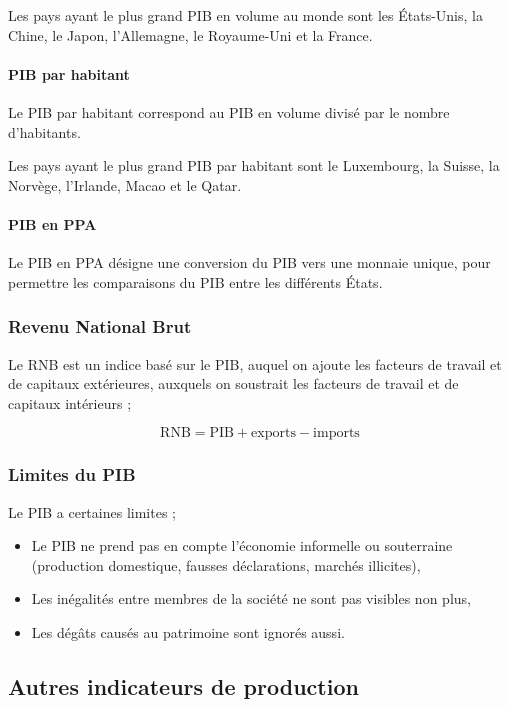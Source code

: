 \documentclass[10pt,a4paper,french]{article}
\begin{document}
Les pays ayant le plus grand PIB en volume au monde sont les États-Unis, la Chine, le Japon, l’Allemagne, le Royaume-Uni et la France.

\paragraph{PIB par habitant}
Le PIB par habitant correspond au PIB en volume divisé par le nombre d’habitants.

Les pays ayant le plus grand PIB par habitant sont le Luxembourg, la Suisse, la Norvège, l’Irlande, Macao
et le Qatar.

\paragraph{PIB en PPA}

Le PIB en PPA désigne une conversion du PIB vers une monnaie unique, pour permettre les
comparaisons du PIB entre les différents États.

\subsubsection{Revenu National Brut}

Le RNB est un indice basé sur le PIB, auquel on ajoute les facteurs de travail et de capitaux extérieures,
auxquels on soustrait les facteurs de travail et de capitaux intérieurs ;

\[
\text{RNB} = \text{PIB} + \text{exports} - \text{imports}
\]

\subsubsection{Limites du PIB}

Le PIB a certaines limites ;

\begin{itemize}
\item Le PIB ne prend pas en compte l’économie informelle ou souterraine (production domestique, fausses
déclarations, marchés illicites),
\item Les inégalités entre membres de la société ne sont pas visibles non plus,
\item Les dégâts causés au patrimoine sont ignorés aussi.
\end{itemize}

\subsection{Autres indicateurs de production}
\end{document}
